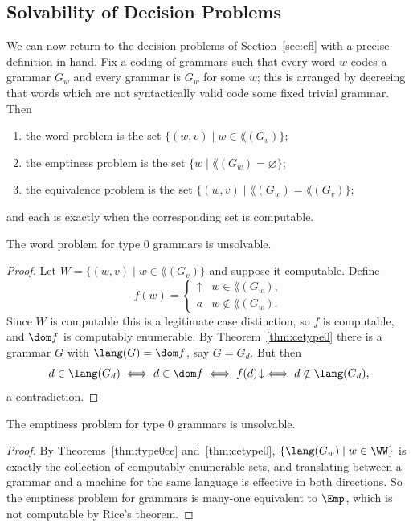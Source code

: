 \subsection{Solvability of Decision Problems}\label{sec:solvability}

We can now return to the decision problems of Section~\ref{sec:cfl} with a precise definition in hand. Fix a coding of grammars such that every word $w$ codes a grammar $G_w$ and every grammar is $G_w$ for some $w$; this is arranged by decreeing that words which are not syntactically valid code some fixed trivial grammar. Then
\begin{enumerate}[label=(\roman*)]
	\item the word problem is the set $\{(w,v) \mid w \in \lang(G_v)\}$;
	\item the emptiness problem is the set $\{w \mid \lang(G_w) = \varnothing\}$;
	\item the equivalence problem is the set $\{(w,v)\mid \lang(G_w) = \lang(G_v)\}$;
\end{enumerate}
and each is  exactly when the corresponding set is computable.

\begin{theorem}
	The word problem for type $0$ grammars is unsolvable.
\end{theorem}

\begin{proof}
	Let $W = \{(w,v)\mid w \in \lang(G_v)\}$ and suppose it computable. Define
	$$f(w) = \begin{cases}\uparrow & w \in \lang(G_w), \\ a & w\notin\lang(G_w).\end{cases}$$
	Since $W$ is computable this is a legitimate case distinction, so $f$ is computable, and $\dom f$ is computably enumerable. By Theorem~\ref{thm:cetype0} there is a grammar $G$ with $\lang(G) = \dom f$, say $G = G_d$. But then
	$$d \in \lang(G_d) \iff d \in \dom f \iff f(d)\!\downarrow \iff d \notin \lang(G_d),$$
	a contradiction.
\end{proof}

\begin{corollary}
	The emptiness problem for type $0$ grammars is unsolvable.
\end{corollary}

\begin{proof}
	By Theorems~\ref{thm:type0ce} and~\ref{thm:cetype0}, $\{\lang(G_w) \mid w\in\WW\}$ is exactly the collection of computably enumerable sets, and translating between a grammar and a machine for the same language is effective in both directions. So the emptiness problem for grammars is many-one equivalent to $\Emp$, which is not computable by Rice's theorem.
\end{proof}


